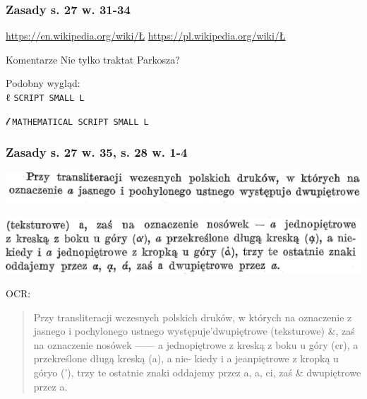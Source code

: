 \documentclass[pdfpagemode=UseNone]{beamer}
\begin{document}
\begin{frame}
  \frametitle{Zasady s. 27 w. 31-34}

  \url{https://en.wikipedia.org/wiki/Ł}
  \url{https://pl.wikipedia.org/wiki/Ł}
  
  \begin{block}{Komentarze}
      Nie tylko traktat Parkosza?

      Podobny wygląd:\\
      
      {ℓ} \texttt{SCRIPT SMALL L}

      {𝓁} \texttt{MATHEMATICAL SCRIPT SMALL L}
      
    \end{block}
\end{frame}


\begin{frame}
  \frametitle{Zasady s. 27 w. 35, s. 28 w. 1-4}
  \includegraphics[width=\hsize]{img/Zasady27-35}
  
  \includegraphics[width=\hsize]{img/Zasady28-1_4}

  OCR:
  \begin{quote}
Przy transliteracji wczesnych polskich druków, w których na
oznaczenie z jasnego i pochylonego ustnego występuje'dwupiętrowe
(teksturowe) \&, zaś na oznaczenie nosówek —— a jednopiętrowe
z kreską z boku u góry (cr), a przekreślone długą kreską (a), a nie-
kiedy i a jeanpiętrowe z kropką u góryo ('), trzy te ostatnie znaki
oddajemy przez a, a, ci, zaś \& dwupiętrowe przez a. 
\end{quote}
\end{frame}
\end{document}

